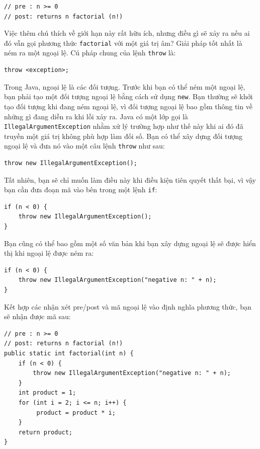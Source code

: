 \begin{verbatim}
// pre : n >= 0
// post: returns n factorial (n!)
\end{verbatim}

Việc thêm chú thích về giới hạn này rất hữu ích, nhưng điều gì sẽ xảy ra
nếu ai đó vẫn gọi phương thức \texttt{factorial} với một giá trị âm?
Giải pháp tốt nhất là ném ra một ngoại lệ. Cú pháp chung của lệnh
\texttt{throw} là:

\begin{verbatim}
throw <exception>;
\end{verbatim}

Trong Java, ngoại lệ là các đối tượng. Trước khi bạn có thể ném một
ngoại lệ, bạn phải tạo một đối tượng ngoại lệ bằng cách sử dụng
\texttt{new}. Bạn thường sẽ khởi tạo đối tượng khi đang ném ngoại lệ, vì
đối tượng ngoại lệ bao gồm thông tin về những gì đang diễn ra khi lỗi
xảy ra. Java có một lớp gọi là \texttt{IllegalArgumentException} nhằm xử
lý trường hợp như thế này khi ai đó đã truyền một giá trị không phù hợp
làm đối số. Bạn có thể xây dựng đối tượng ngoại lệ và đưa nó vào một câu
lệnh \texttt{throw} như sau:

\begin{verbatim}
throw new IllegalArgumentException();
\end{verbatim}

Tất nhiên, bạn sẽ chỉ muốn làm điều này khi điều kiện tiên quyết thất
bại, vì vậy bạn cần đưa đoạn mã vào bên trong một lệnh \texttt{if}:

\begin{verbatim}
if (n < 0) {
    throw new IllegalArgumentException();
}
\end{verbatim}

Bạn cũng có thể bao gồm một số văn bản khi bạn xây dựng ngoại lệ sẽ được
hiển thị khi ngoại lệ được ném ra:

\begin{verbatim}
if (n < 0) {
    throw new IllegalArgumentException("negative n: " + n);
}
\end{verbatim}

Kết hợp các nhận xét pre/post và mã ngoại lệ vào định nghĩa phương thức,
bạn sẽ nhận được mã sau:

\begin{verbatim}
// pre : n >= 0 
// post: returns n factorial (n!) 
public static int factorial(int n) {
    if (n < 0) { 
        throw new IllegalArgumentException("negative n: " + n);
    } 
    int product = 1;
    for (int i = 2; i <= n; i++) {
         product = product * i;
    }
    return product;
}
\end{verbatim}

